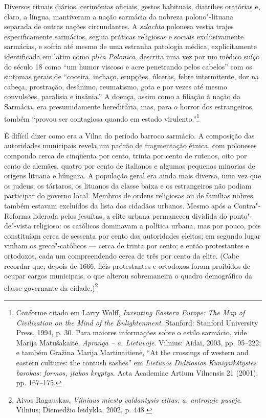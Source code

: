 Diversos rituais diários, cerimônias oficiais, gestos habituais,
diatribes oratórias e, claro, a língua, mantiveram a nação sarmácia da
nobreza polono"-lituana separada de outras nações circundantes. A
\emph{szlachta} polonesa vestia trajes especificamente sarmácios, seguia
práticas religiosas e sociais exclusivamente sarmácias, e sofria até
mesmo de uma estranha patologia médica, explicitamente identificada em
latim como \emph{plica Polonica}, descrita uma vez por um médico suíço
do século 18 como ``um humor viscoso e acre penetrando pelos cabelos''
com os sintomas gerais de ``coceira, inchaço, erupções, úlceras, febre
intermitente, dor na cabeça, prostração, desânimo, reumatismo, gota e
por vezes até mesmo convulsões, paralisia e insânia.'' A doença, assim
como a filiação à nação da Sarmácia, era presumidamente hereditária,
mas, para o horror dos estrangeiros, também ``provou ser contagiosa
quando em estado virulento.''\footnote{Conforme citado em Larry Wolff,
  \emph{Inventing Eastern Europe: The Map of Civilization on the Mind of
  the Enlightenment}. Stanford: Stanford University Press, 1994, p. 30.
  Para maiores informações sobre o estilo sarmácio, vide Marija
  Matušakaitė, \emph{Apranga -- a. Lietuvoje}. Vilnius: Aidai,
  2003, pp. 95--222; e também Gražina Marija Martinaitienė, ``At the
  crossings of western and eastern cultures: the contush sashes'' em
  \emph{Lietuvos Didžiosios Kunigaikštystės barokas: formos, įtakos
  kryptys.} Acta Academiae Artium Vilnensis 21 (2001), pp. 167--175.}

É difícil dizer como era a Vilna do período barroco sarmácio. A
composição das autoridades municipais revela um padrão de fragmentação
étnica, com poloneses compondo cerca de cinqüenta por cento, trinta por
cento de rutenos, oito por cento de alemães, quatro por cento de
italianos e algumas pequenas minorias de origens lituana e húngara. A
população geral era ainda mais diversa, uma vez que os judeus, os
tártaros, os lituanos da classe baixa e os estrangeiros não podiam
participar do governo local. Membros de ordens religiosas ou de famílias
nobres também estavam excluídos da lista dos cidadãos urbanos. Mesmo
após a Contra"-Reforma liderada pelos jesuítas, a elite urbana permaneceu
dividida do ponto"-de"-vista religioso: os católicos dominavam a política
urbana, mas por pouco, pois constituíam cerca de sessenta por cento das
autoridades eleitas; em segundo lugar vinham os greco"-católicos --- cerca
de trinta por cento; e então protestantes e ortodoxos, cada um
compreendendo cerca de três por cento da elite. (Cabe recordar que,
depois de 1666, fiéis protestantes e ortodoxos foram proibidos de ocupar
cargos municipais, o que alterou sobremaneira o quadro demográfico da
classe governante da cidade.)\footnote{Aivas Ragauskas, \emph{Vilniaus
  miesto valdantysis elitas:  a. antrojoje pusėje}. Vilnius;
  Diemedžio leidykla, 2002, p. 448.}

